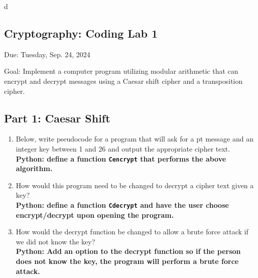 \documentclass[11pt]{article}
\newenvironment{solution}
  {\textit{Solution.}}
\newcommand{\sol}[1]{
    \begin{customframedproof}
        \begin{solution}
        #1
        \end{solution}
    \end{customframedproof}
}
\begin{document}
d
\begin{center}
    \section*{Cryptography: Coding Lab 1}

    \large{Due: Tuesday, Sep. 24, 2024}
\end{center}
Goal: Implement a computer program utilizing modular arithmetic that can encrypt and decrypt messages using a Caesar shift cipher and a transposition cipher.
\subsection*{Part 1: Caesar Shift}

\begin{enumerate}
    \item	Below, write pseudocode for a program that will ask for a pt message and an integer key between 1 and 26 and output the appropriate cipher text. \\
          \textbf{Python: define a function \texttt{Cencrypt} that performs the above algorithm.}


    \item	How would this program need to be changed to decrypt a cipher text given a key? \\
          \textbf{Python: define a function \texttt{Cdecrypt} and have the user choose encrypt/decrypt upon opening the program.}


    \item	How would the decrypt function be changed to allow a brute force attack if we did not know the key? \\
          \textbf{Python: Add an option to the decrypt function so if the person does not know the key, the program will perform a brute force attack.}


\end{enumerate}
\end{document}
